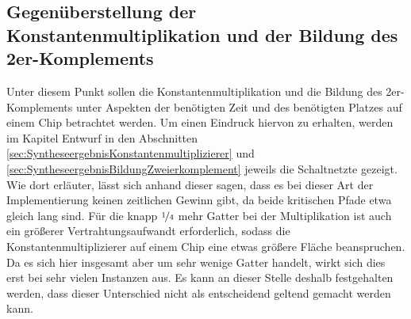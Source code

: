 \subsection{Gegenüberstellung der Konstantenmultiplikation und der Bildung des 2er-Komplements}

Unter diesem Punkt sollen die Konstantenmultiplikation und die Bildung des 2er-Komplements unter Aspekten der benötigten Zeit und des benötigten Platzes auf einem Chip 
betrachtet werden. Um einen Eindruck hiervon zu erhalten, werden im Kapitel Entwurf in den Abschnitten \ref{sec:SyntheseergebnisKonstantenmultiplizierer} und
\ref{sec:SyntheseergebnisBildungZweierkomplement} jeweils die Schaltnetzte 
gezeigt.
Wie dort erläuter, lässt sich anhand dieser sagen, dass es bei dieser Art der Implementierung keinen zeitlichen Gewinn gibt, da beide kritischen Pfade etwa gleich lang 
sind. Für die knapp $\nicefrac{1}{4}$ mehr Gatter bei der Multiplikation ist auch ein größerer Vertrahtungsaufwandt erforderlich, sodass die Konstantenmultiplizierer
auf einem Chip eine etwas größere Fläche beanspruchen. Da es sich hier insgesamt aber um sehr wenige Gatter handelt, wirkt sich dies erst bei sehr vielen Instanzen aus.
Es kann an dieser Stelle deshalb festgehalten werden, dass dieser Unterschied nicht als entscheidend geltend gemacht werden kann.
